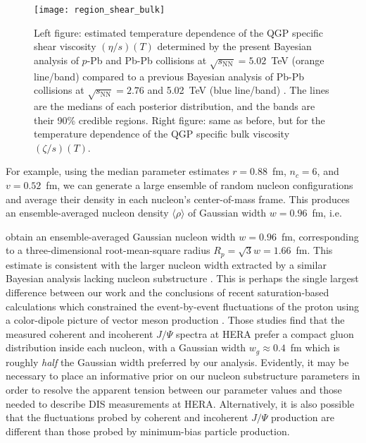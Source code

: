 \documentclass[aps,prc,reprint,amsmath,nofootinbib]{revtex4-1}
\newcommand{\sqrts}{\sqrt{s_\mathrm{NN}}}
\begin{document}
\begin{figure}
  \texttt{[image: region\_shear\_bulk]}
  \caption{
    \label{fig:region_shear_bulk}
    Left figure: estimated temperature dependence of the QGP specific shear viscosity $(\eta/s)(T)$ determined by the present Bayesian analysis of $p$-Pb and Pb-Pb collisions at $\sqrts=5.02$~TeV (orange line/band) compared to a previous Bayesian analysis of Pb-Pb collisions at $\sqrts=2.76$ and 5.02~TeV (blue line/band) \cite{Bernhard:2018hnz}.
    The lines are the medians of each posterior distribution, and the bands are their 90\% credible regions.
    Right figure: same as before, but for the temperature dependence of the QGP specific bulk viscosity $(\zeta/s)(T)$.
  }
\end{figure}

For example, using the median parameter estimates $r=0.88$~fm, $n_c=6$, and $v=0.52$~fm, we can generate a large ensemble of random nucleon configurations and average their density in each nucleon's center-of-mass frame.
This produces an ensemble-averaged nucleon density $\langle \rho \rangle$ of Gaussian width $w = 0.96$~fm, i.e.\

obtain an ensemble-averaged Gaussian nucleon width $w = 0.96$~fm, corresponding to a three-dimensional root-mean-square radius $R_p = \sqrt{3} w = 1.66$~fm.
This estimate is consistent with the larger nucleon width extracted by a similar Bayesian analysis lacking nucleon substructure \cite{Bernhard:2018hnz}.
This is perhaps the single largest difference between our work and the conclusions of recent saturation-based calculations which constrained the event-by-event fluctuations of the proton using a color-dipole picture of vector meson production \cite{Mantysaari:2016ykx, Mantysaari:2016jaz}.
Those studies find that the measured coherent and incoherent $J/\Psi$ spectra at HERA prefer a compact gluon distribution inside each nucleon, with a Gaussian width $w_g \approx 0.4$~fm which is roughly \emph{half} the Gaussian width preferred by our analysis.
Evidently, it may be necessary to place an informative prior on our nucleon substructure parameters in order to resolve the apparent tension between our parameter values and those needed to describe DIS measurements at HERA.
Alternatively, it is also possible that the fluctuations probed by coherent and incoherent $J/\Psi$ production are different than those probed by minimum-bias particle production.
\end{document}
